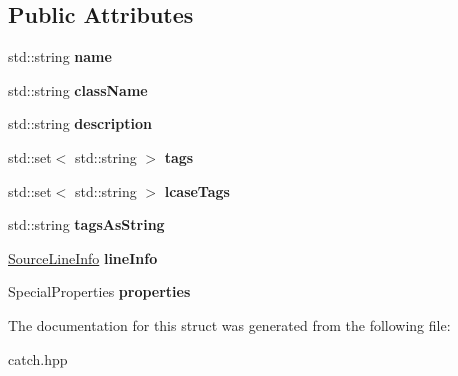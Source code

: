 \subsection*{Public Attributes}
\begin{DoxyCompactItemize}
\item 
\mbox{\label{struct_catch_1_1_test_case_info_a463794e2f5cfead307c93efd134ade36}} 
std\+::string {\bfseries name}
\item 
\mbox{\label{struct_catch_1_1_test_case_info_a1a5e0825132a38d091defdebbf2f8ce9}} 
std\+::string {\bfseries class\+Name}
\item 
\mbox{\label{struct_catch_1_1_test_case_info_a37fe2db9425bc45f6a33893eac31198e}} 
std\+::string {\bfseries description}
\item 
\mbox{\label{struct_catch_1_1_test_case_info_a045f62e7719a8760a5b456f7fd2dc97c}} 
std\+::set$<$ std\+::string $>$ {\bfseries tags}
\item 
\mbox{\label{struct_catch_1_1_test_case_info_a0ed3864a313e8ddc3ae38431be5be9ae}} 
std\+::set$<$ std\+::string $>$ {\bfseries lcase\+Tags}
\item 
\mbox{\label{struct_catch_1_1_test_case_info_ac65c2d36fd36f71e9bf782b2ea245c64}} 
std\+::string {\bfseries tags\+As\+String}
\item 
\mbox{\label{struct_catch_1_1_test_case_info_aa9407b7f442655b51a2aad24b3fa2fd3}} 
\hyperlink{struct_catch_1_1_source_line_info}{Source\+Line\+Info} {\bfseries line\+Info}
\item 
\mbox{\label{struct_catch_1_1_test_case_info_afc1e84bd7a2e180895a06d9131302af0}} 
Special\+Properties {\bfseries properties}
\end{DoxyCompactItemize}


The documentation for this struct was generated from the following file\+:\begin{DoxyCompactItemize}
\item 
catch.\+hpp\end{DoxyCompactItemize}
